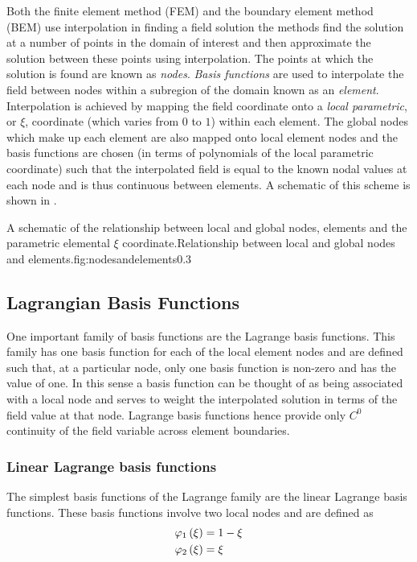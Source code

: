 Both the finite element method (FEM) and the boundary element method (BEM) use
interpolation in finding a field solution \ie the methods find the solution at
a number of points in the domain of interest and then approximate the solution
between these points using interpolation. The points at which the solution is
found are known as \emph{nodes}. \emph{Basis functions} are used to
interpolate the field between nodes within a subregion of the domain known as
an \emph{element}. Interpolation is achieved by mapping the field coordinate
onto a \emph{local parametric}, or $\xi$, coordinate (which varies from $0$ to
$1$) within each element. The global nodes which make up each element are also
mapped onto local element nodes and the basis functions are chosen (in terms
of polynomials of the local parametric coordinate) such that the interpolated
field is equal to the known nodal values at each node and is thus continuous
between elements. A schematic of this
scheme is shown in .

{A schematic of the relationship between local and global nodes, elements and the parametric elemental $\xi$
  coordinate.}{Relationship between local and global nodes and elements.}{fig:nodesandelements}{0.3}

\subsection{Lagrangian Basis Functions}
\label{sec:lagrangebasisfunctions}

One important family of basis functions are the Lagrange basis functions. This
family has one basis function for each of the local element nodes and are
defined such that, at a particular node, only one basis function is non-zero
and has the value of one. In this sense a basis function can be thought of as
being associated with a local node and serves to weight the interpolated
solution in terms of the field value at that node. Lagrange basis functions
hence provide only $C^{0}$ continuity of the field variable across element
boundaries.

\subsubsection{Linear Lagrange basis functions}

The simplest basis functions of the Lagrange family are the \onedal linear
Lagrange basis functions. These basis functions involve two local nodes and
are defined as
\begin{equation}
  \begin{split}
    \lbfn{1}{\xi}&=1-\xi \\
    \lbfn{2}{\xi}&=\xi
  \end{split}
  \label{eqn:linearlbfuns}
\end{equation}

